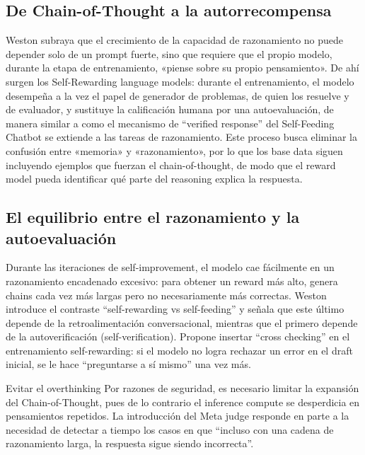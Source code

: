 \documentclass[a4paper]{article}
\begin{document}
\subsection{De Chain-of-Thought a la autorrecompensa}
Weston subraya que el crecimiento de la capacidad de razonamiento no puede depender solo de un prompt fuerte, sino que requiere que el propio modelo, durante la etapa de entrenamiento, «piense sobre su propio pensamiento». De ahí surgen los Self-Rewarding language models: durante el entrenamiento, el modelo desempeña a la vez el papel de generador de problemas, de quien los resuelve y de evaluador, y sustituye la calificación humana por una autoevaluación, de manera similar a como el mecanismo de ``verified response'' del Self-Feeding Chatbot se extiende a las tareas de razonamiento. Este proceso busca eliminar la confusión entre «memoria» y «razonamiento», por lo que los base data siguen incluyendo ejemplos que fuerzan el chain-of-thought, de modo que el reward model pueda identificar qué parte del reasoning explica la respuesta.

\subsection{El equilibrio entre el razonamiento y la autoevaluación}
Durante las iteraciones de self-improvement, el modelo cae fácilmente en un razonamiento encadenado excesivo: para obtener un reward más alto, genera chains cada vez más largas pero no necesariamente más correctas. Weston introduce el contraste ``self-rewarding vs self-feeding'' y señala que este último depende de la retroalimentación conversacional, mientras que el primero depende de la autoverificación (self-verification). Propone insertar ``cross checking'' en el entrenamiento self-rewarding: si el modelo no logra rechazar un error en el draft inicial, se le hace ``preguntarse a sí mismo'' una vez más.

\begin{warningbox}{Evitar el overthinking}
Por razones de seguridad, es necesario limitar la expansión del Chain-of-Thought, pues de lo contrario el inference compute se desperdicia en pensamientos repetidos. La introducción del Meta judge responde en parte a la necesidad de detectar a tiempo los casos en que ``incluso con una cadena de razonamiento larga, la respuesta sigue siendo incorrecta''.
\end{warningbox}
\end{document}
